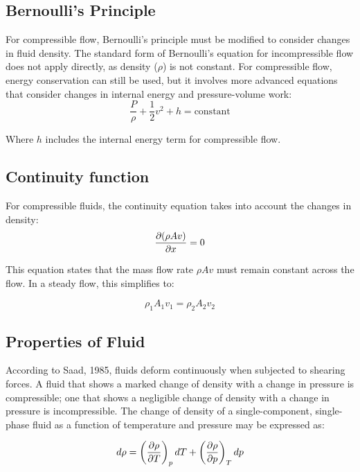 
\subsection{Bernoulli's Principle}
For compressible flow, Bernoulli's principle must be modified to consider changes in fluid density. The standard form of Bernoulli's equation for incompressible flow does not apply directly, as density (\(\rho\)) is not constant. For compressible flow, energy conservation can still be used, but it involves more advanced equations that consider changes in internal energy and pressure-volume work:
\begin{equation}
    \frac{P}{\rho} + \frac{1}{2} v^2 + h = \text{constant}
\end{equation}

Where \(h\) includes the internal energy term for compressible flow.

\subsection{Continuity function}
For compressible fluids, the continuity equation takes into account the changes in density:
\begin{equation}
    \frac{\partial (\rho A v)}{\partial x} = 0
    \notag
\end{equation}

This equation states that the mass flow rate \(\rho A v\) must remain constant across the flow. In a steady flow, this simplifies to:

\begin{equation}
    \rho_1 A_1 v_1 = \rho_2 A_2 v_2
\end{equation}

\subsection{Properties of Fluid}
According to Saad, 1985, fluids deform continuously when subjected to shearing forces. A fluid that shows a marked change of density with a change in pressure is compressible; one that shows a negligible change of density with a change in pressure is incompressible. The change of density of a single-component, single-phase fluid as a function of temperature and pressure may be expressed as:\cite{saad-1985}

\begin{equation}
d\rho = \left( \frac{\partial \rho}{\partial T} \right)_p dT + \left( \frac{\partial \rho}{\partial p} \right)_T dp
\notag
\end{equation}

